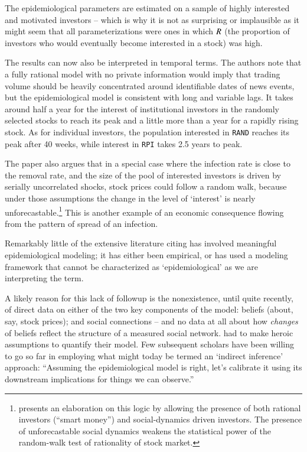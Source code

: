 The epidemiological parameters are estimated on a sample of highly interested and motivated investors -- which is why it is not as surprising or implausible as it might seem that all parameterizations were ones in which $\Recovered$ (the proportion of investors who would eventually become interested in a stock) was high.

The results can now also be interpreted in temporal terms.  The authors note that a fully rational model with no private information would imply that trading volume should be heavily concentrated around identifiable dates of news events, but the epidemiological model is consistent with long and variable lags.  It takes around half a year for the interest of institutional investors in the randomly selected stocks to reach its peak and a little more than a year for a rapidly rising stock. As for individual investors, the population interested in \texttt{RAND} reaches its peak after 40 weeks, while interest in \texttt{RPI} takes 2.5 years to peak.

The paper also argues that in a special case where the infection rate is close to the removal rate, and the size of the pool of interested investors is driven by serially uncorrelated shocks, stock prices could follow a random walk, because under those assumptions the change in the level of `interest' is nearly unforecastable.\footnote{\cite{shiller1984stock} presents an  elaboration on this logic by allowing the presence of both rational investors (``smart money'') and social-dynamics driven investors. The presence of unforecastable social dynamics weakens the statistical power of the random-walk test of rationality of stock market.} This is another example of an economic consequence flowing from the pattern of spread of an infection.  %

Remarkably little of the extensive literature citing \cite{shiller1989survey} has involved meaningful epidemiological modeling; it has either been empirical, or has used a modeling framework that cannot be characterized as `epidemiological' as we are interpreting the term. %

A likely reason for this lack of followup is the nonexistence, until quite recently, of direct data on either of the two key components of the model: beliefs (about, say, stock prices); and social connections -- and no data at all about how \textit{changes} of beliefs reflect the structure of a measured social network.  \cite{shiller1989survey} had to make heroic assumptions to quantify their model.  Few subsequent scholars have been willing to go so far in employing what might today be termed an `indirect inference' approach: ``Assuming the epidemiological model is right, let's calibrate it using its downstream implications for things we can observe.''

